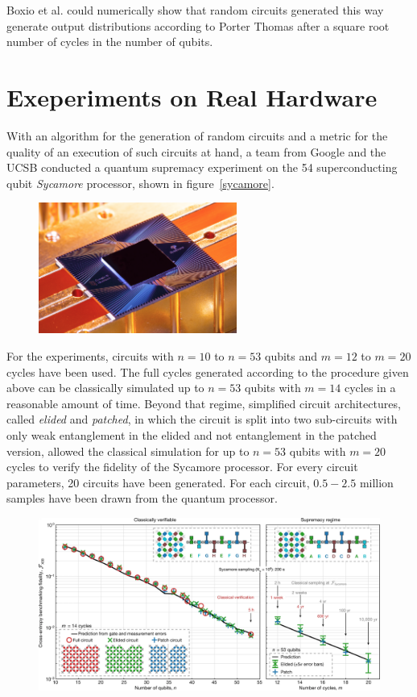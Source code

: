 Boxio et al. could numerically show that random circuits generated this way
generate output distributions according to Porter Thomas after a square root
number of cycles in the number of qubits.

\section{Exeperiments on Real Hardware}

With an algorithm for the generation of random circuits and a metric for the
quality of an execution of such circuits at hand, a team from Google and the UCSB conducted a quantum
supremacy experiment on the 54 superconducting qubit \textit{Sycamore}
processor, shown in figure~\ref{sycamore}.

\begin{figure}[H]
  \centering
  \label{fig:sycamore}
  \includegraphics[width=0.58\textwidth]{figures/sycamore}
\end{figure}

For the experiments, circuits with $n=10$ to $n=53$ qubits and
$m=12$ to $m=20$ cycles have been used. The full cycles generated according to the procedure
given above can be classically simulated up to $n=53$ qubits with $m=14$ cycles
in a reasonable amount of time. Beyond that regime, simplified circuit
architectures, called \textit{elided} and \textit{patched}, in which the
circuit is split into two sub-circuits with only weak entanglement in the elided and not
entanglement in the patched version, allowed the classical simulation for up to $n=53$ qubits with $m=20$ cycles to
verify the fidelity of the Sycamore processor. For every circuit parameters, 20
circuits have been generated. For each circuit, $0.5-2.5$ million samples have been drawn
from the quantum processor.

\begin{figure}[H]
  \centering
  \label{fig:supremacy_results}
  \includegraphics[width=\textwidth]{figures/supremacy_results}
\end{figure}

